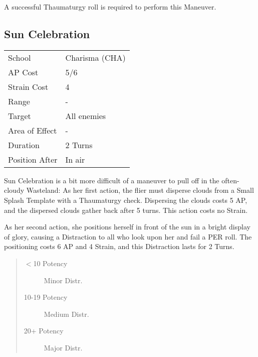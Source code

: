 \documentclass[11pt,a4paper,twocolumn]{book}
\begin{document}
A successful Thaumaturgy roll is required to perform this Maneuver.


\subsection*{Sun Celebration}
{
	\begin{tabu} to 75mm{| X[l,4] | X[l,7] |}
		\hline
		School 			& Charisma (CHA) 	\\
		AP Cost	      	& 5/6 				\\
		Strain Cost     & 4 				\\
		Range     		& - 				\\
		Target      	& All enemies 		\\
		Area of Effect  & - 	 			\\
		Duration     	& 2 Turns 	 		\\
		Position After  & In air 			\\ \hline
	\end{tabu}
	
}

\medskip

Sun Celebration is a bit more difficult of a maneuver to pull off in the often-cloudy Wasteland: As her first action, the flier must disperse clouds from a Small Splash Template with a Thaumaturgy check. Dispersing the clouds costs 5 AP, and the dispersed clouds gather back after 5 turns. This action costs no Strain.

As her second action, she positions herself in front of the sun in a bright display of glory, causing a Distraction to all who look upon her and fail a PER roll. The positioning costs 6 AP and 4 Strain, and this Distraction lasts for 2 Turns. 

\begin{quote}
	\begin{description}
		\item[$<$10 Potency] 	Minor Distr.
		\item[10-19 Potency] 	Medium Distr.
		\item[20+ Potency] 	Major Distr.
	\end{description}
\end{quote}

\medskip
\end{document}

